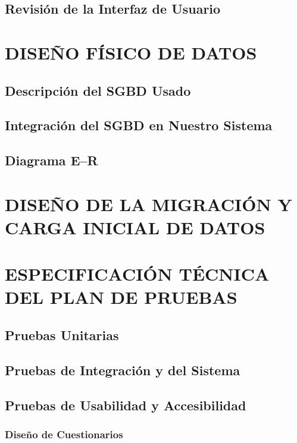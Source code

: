\documentclass[11pt]{report}
\begin{document}
\subsection{Revisión de la Interfaz de Usuario}


\newpage
\section{DISEÑO FÍSICO DE DATOS}

\subsection{Descripción del SGBD Usado} 

\subsection{Integración del SGBD en Nuestro Sistema} 

\subsection{Diagrama E--R} 


\newpage
\section{DISEÑO DE LA MIGRACIÓN Y CARGA INICIAL DE DATOS}


\newpage
\section{ESPECIFICACIÓN TÉCNICA DEL PLAN DE PRUEBAS}

\subsection{Pruebas Unitarias} 

\subsection{Pruebas de Integración y del Sistema} 

\subsection{Pruebas de Usabilidad y Accesibilidad} 

\subsubsection{Diseño de Cuestionarios} 
\end{document}
